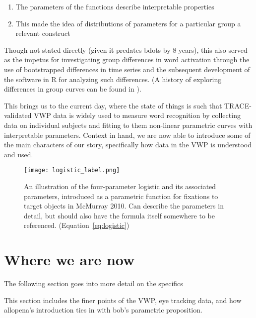 \begin{singlespace}
\begin{enumerate}
\vspace{-3mm}
\item The parameters of the functions describe interpretable properties
\item This made the idea of distributions of parameters for a particular group a relevant construct
\end{enumerate}
\end{singlespace}

Though not stated directly (given it predates bdots by 8 years), this also served as the impetus for investigating group differences in word activation through the use of bootstrapped differences in time series \cite{oleson2017detecting} and the subsequent development of the  software in R for analyzing such differences. (A history of exploring differences in group curves can be found in \cite{seedorff2018bdots}).

This brings us to the current day, where the state of things is such that TRACE-validated VWP data is widely used to measure word recognition by collecting data on individual subjects and fitting to them non-linear parametric curves with interpretable parameters. Context in hand, we are now able to introduce some of the main characters of our story, specifically how data in the VWP is understood and used. 



\begin{figure}[h]
\centering
\texttt{[image: logistic\_label.png]}
\caption{An illustration of the four-parameter logistic and its associated parameters, introduced as a parametric function for fixations to target objects in McMurray 2010. Can describe the parameters in detail, but should also have the formula itself somewhere to be referenced. (Equation~\ref{eq:logistic})}
\label{fig:logistic_definition}
\end{figure}



\section{Where we are now}

The following section goes into more detail on the specifics

This section includes the finer points of the VWP, eye tracking data, and how allopena's introduction ties in with bob's parametric proposition.

